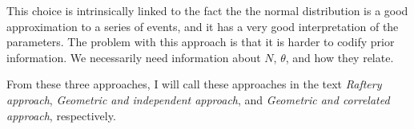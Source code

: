This choice is intrinsically linked to the fact the the normal distribution is
a good approximation to a series of events, and it has a very good
interpretation of the parameters. The problem with this approach is that it is
harder to codify prior information. We necessarily need information about $N$,
$\theta$, and how they relate. 

\ind From these three approaches, I will call these approaches in the text {\em Raftery approach},  {\em Geometric and independent approach}, and {\em Geometric
and correlated approach}, respectively. 

\vspace{2ex}